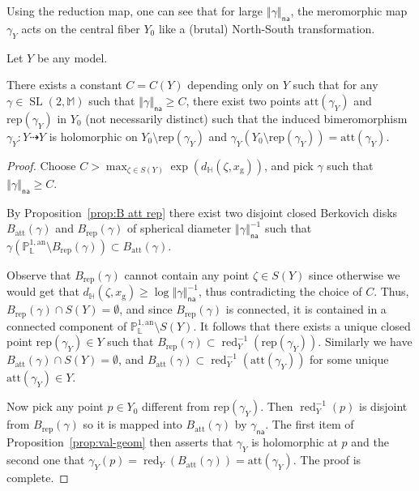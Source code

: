 \documentclass[AHL,Unicode,longabstracts]{cedram}
\DeclareMathOperator{\red}{red}
\DeclareMathOperator{\SL}{SL}
\newcommand{\hh}{\mathbb{H}}
\newcommand{\mm}{\mathbb{M}}
\newcommand{\an}{\mathrm{an}}
\newcommand{\norm}[1]{\left\Vert#1\right\Vert}
\newcommand{\PP}{\mathbb{P}}
\newcommand{\Laurent}{\mathbb{L}}
\newcommand{\att}{\mathrm{att}}
\newcommand{\rep}{\mathrm{rep}}
\newcommand{\na}{\mathsf{na}}
\begin{document}
Using the reduction map, one can see that for large $\norm{\gamma}_\na$, the meromorphic map $\gamma_Y$ acts on the central fiber $Y_0$ like a (brutal) North-South transformation.

\begin{prop}\label{prop:nordsud}
Let $Y$ be any model.

There exists a constant $C=C(Y)$ depending only on $Y$ such that for any $\gamma \in \SL(2,\mm)$ such that $\norm{\gamma}_\na\geq C$, there exist two points $\mathrm{att}(\gamma_Y)$ and $\mathrm{rep}(\gamma_Y)$ in $Y_0$ (not necessarily distinct) such that the induced bimeromorphism $\gamma_Y: Y \dashrightarrow Y$ is holomorphic on $Y_0\setminus \mathrm{rep}(\gamma_Y)$ and $\gamma_Y(Y_0\setminus \mathrm{rep}(\gamma_Y)) = \mathrm{att}(\gamma_Y)$.
\end{prop}
\begin{proof}
Choose $C > \max_{\zeta \in S(Y)} \exp(d_\hh (\zeta, x_{\mathrm{g}}))$, and pick $\gamma$ such that $\norm{\gamma}_\na\geq C$.

By Proposition~\ref{prop:B att rep} there exist two disjoint closed Berkovich disks $B_{\att}(\gamma)$ and $B_{\rep}(\gamma)$ of spherical diameter $\norm{\gamma}^{-1}_\na$ such that $\gamma (\PP^{1,\an}_{\Laurent}\setminus B_{\rep}(\gamma)) \subset B_{\att}(\gamma)$.

Observe that $ B_{\rep}(\gamma)$ cannot contain any point $\zeta \in S(Y)$ since otherwise we would get that $d_\hh (\zeta, x_{\mathrm{g}}) \ge \log \norm{\gamma}_\na^{-1}$, thus contradicting the choice of $C$. Thus, $ B_{\rep}(\gamma) \cap S(Y) = \emptyset$, and since $B_{\rep}(\gamma)$ is connected, it is contained in a connected component of $\PP^{1,\an}_{\Laurent}\setminus S(Y)$. It follows that there exists a unique closed point $\mathrm{rep}(\gamma_Y)\in Y$ such that $B_{\rep}(\gamma) \subset \red_Y^{-1}(\mathrm{rep}(\gamma_Y))$. Similarly we have $B_{\att}(\gamma) \cap S(Y) = \emptyset$, and $B_{\att}(\gamma)\subset \red_Y^{-1}(\mathrm{att}(\gamma_Y))$ for some unique $\mathrm{att}(\gamma_Y)\in Y$.

Now pick any point $p \in Y_0$ different from $\mathrm{rep}(\gamma_Y)$. Then $\red_Y^{-1}(p)$ is disjoint from $B_{\rep}(\gamma)$ so it is mapped into $B_{\att}(\gamma)$ by $\gamma_\na$. The first item of Proposition~\ref{prop:val-geom} then asserts that $\gamma_{Y}$ is holomorphic at $p$ and the second one that $\gamma_{Y}(p) =\red_Y(B_{\att}(\gamma)) = \mathrm{att}(\gamma_Y)$. The proof is complete.
\end{proof}
\end{document}
